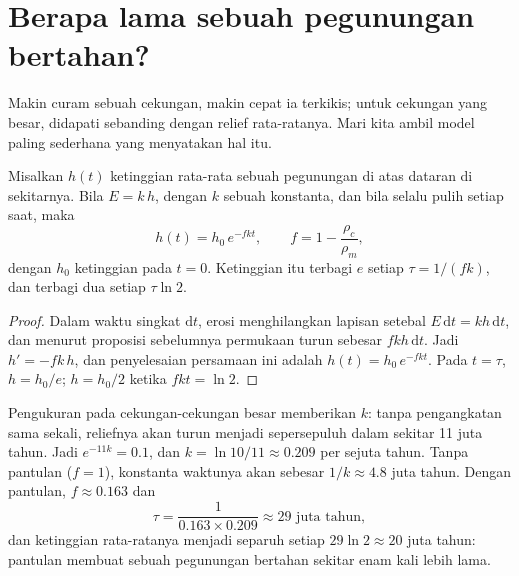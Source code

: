 \section{Berapa lama sebuah pegunungan bertahan?}

Makin curam sebuah cekungan, makin cepat ia terkikis; untuk cekungan yang
besar,  didapati sebanding dengan relief rata-ratanya. Mari kita
ambil model paling sederhana yang menyatakan hal itu.

\begin{proposition}\label{prop:g12:destruction-of-mountains:decay}
Misalkan $h(t)$ ketinggian rata-rata sebuah pegunungan di atas dataran di
sekitarnya. Bila  $E = k\,h$, dengan $k$ sebuah konstanta, dan
bila  selalu pulih setiap saat, maka
\[
  h(t) = h_0\, e^{-f k t}, \qquad f = 1 - \frac{\rho_c}{\rho_m},
\]
dengan $h_0$ ketinggian pada $t = 0$. Ketinggian itu terbagi $e$ setiap
$\tau = 1/(fk)$, dan terbagi dua setiap $\tau \ln 2$.
\end{proposition}

\begin{proof}
Dalam waktu singkat $\mathrm{d}t$, erosi menghilangkan lapisan setebal $E\,\mathrm{d}t
= k h\,\mathrm{d}t$, dan menurut proposisi sebelumnya permukaan turun sebesar
$f k h\,\mathrm{d}t$. Jadi $h' = -fk\,h$, dan penyelesaian persamaan ini
adalah $h(t) = h_0\,e^{-fkt}$. Pada $t = \tau$, $h = h_0/e$; $h = h_0/2$
ketika $fkt = \ln 2$.
\end{proof}

Pengukuran pada cekungan-cekungan besar memberikan $k$: tanpa pengangkatan sama
sekali, reliefnya akan turun menjadi sepersepuluh dalam sekitar 11 juta tahun.
Jadi $e^{-11k} = 0.1$, dan $k =
\ln 10/11 \approx 0.209$ per sejuta tahun. Tanpa pantulan ($f = 1$), konstanta
waktunya akan sebesar $1/k \approx 4.8$ juta tahun. Dengan pantulan, $f
\approx 0.163$ dan
\[
  \tau = \frac{1}{0.163 \times 0.209} \approx 29 \text{ juta tahun},
\]
dan ketinggian rata-ratanya menjadi separuh setiap $29 \ln 2 \approx 20$ juta
tahun: pantulan membuat sebuah pegunungan bertahan sekitar enam kali lebih
lama.

